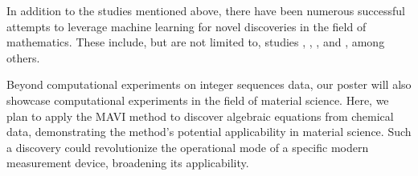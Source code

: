\documentclass[runningheads]{llncs}
\begin{document}
In addition to the studies mentioned above, there have been numerous successful attempts to leverage machine learning for novel discoveries in the field of mathematics. These include, but are not limited to, studies \cite{guided-AI}, \cite{murmurations}, \cite{MLfano}, and \cite{MLsing}, among others.

Beyond computational experiments on integer sequences data, our poster will also showcase computational experiments in the field of material science. Here, we plan to apply the MAVI method to discover algebraic equations from chemical data, demonstrating the method’s potential applicability in material science. 
Such a discovery could revolutionize the operational mode of 
a specific modern measurement device, broadening its applicability.











\end{document}
